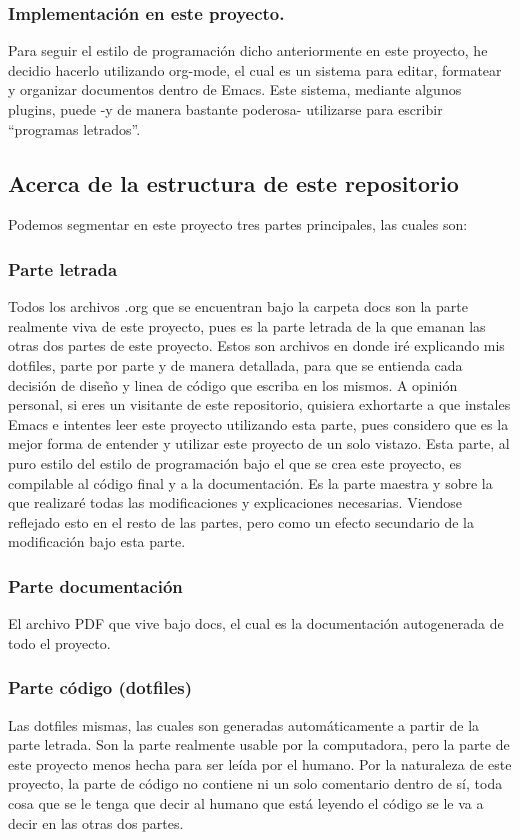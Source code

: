 \documentclass[11pt]{article}
\begin{document}
\subsubsection{Implementación en este proyecto.}
\label{sec:orga0d27cb}
Para seguir el estilo de programación dicho anteriormente en este proyecto, he decidio hacerlo utilizando org-mode, el cual es un sistema para editar, formatear y organizar documentos dentro de Emacs. Este sistema, mediante algunos plugins, puede -y de manera bastante poderosa- utilizarse para escribir ``programas letrados''.
\subsection{Acerca de la estructura de este repositorio}
\label{sec:orgb38eb30}
Podemos segmentar en este proyecto tres partes principales, las cuales son:
\subsubsection{Parte letrada}
\label{sec:orgaaf12d5}
Todos los archivos .org que se encuentran bajo la carpeta docs son la parte realmente viva de este proyecto, pues es la parte letrada de la que emanan las otras dos partes de este proyecto.
Estos son archivos en donde iré explicando mis dotfiles, parte por parte y de manera detallada, para que se entienda cada decisión de diseño y linea de código que escriba en los mismos. A opinión personal, si eres un visitante de este repositorio, quisiera exhortarte a que instales Emacs e intentes leer este proyecto utilizando esta parte, pues considero que es la mejor forma de entender y utilizar este proyecto de un solo vistazo. Esta parte, al puro estilo del estilo de programación bajo el que se crea este proyecto, es compilable al código final y a la documentación. Es la parte maestra y sobre la que realizaré todas las modificaciones y explicaciones necesarias. Viendose reflejado esto en el resto de las partes, pero como un efecto secundario de la modificación bajo esta parte.
\subsubsection{Parte documentación}
\label{sec:org2cdf8e8}
El archivo PDF que vive bajo docs, el cual es la documentación autogenerada de todo el proyecto.
\subsubsection{Parte código (dotfiles)}
\label{sec:org3aaf891}
Las dotfiles mismas, las cuales son generadas automáticamente a partir de la parte letrada. Son la parte realmente usable por la computadora, pero la parte de este proyecto menos hecha para ser leída por el humano. Por la naturaleza de este proyecto, la parte de código no contiene ni un solo comentario dentro de sí, toda cosa que se le tenga que decir al humano que está leyendo el código se le va a decir en las otras dos partes.
\end{document}
